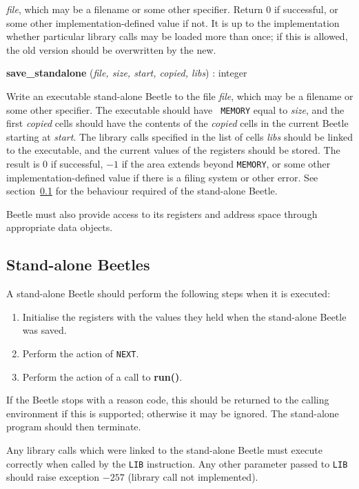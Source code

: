 \documentclass{article}
\newlength{\itemwidth}\itemwidth=\textwidth \advance\itemwidth by -0.1in
\newlength{\innerwidth}\innerwidth=\itemwidth \advance\innerwidth by -0.5in
\newcommand{\iface}[4]{\item[]\parbox{\itemwidth}{{\bf #1} ({\it #2}\/) :
#3\\[0.5ex]\hspace*{0.4in}\parbox{\innerwidth}{#4}}}
\begin{document}
\begin{description}
{    \textit{file}, which may be a filename or some other specifier. Return 0 if
    successful, or some other implementation-defined value if not. It is up
    to the implementation whether particular library calls may be loaded
    more than once; if this is allowed, the old version should be
    overwritten by the new.}
\iface{save\_standalone}{file, size, start, copied, libs}{integer}{Write an
    executable stand-alone Beetle to the file \textit{file}, which may be a
    filename or some other specifier. The executable should have {\tt
    MEMORY} equal to \textit{size}, and the first \textit{copied} cells should
    have the contents of the \textit{copied} cells in the current Beetle
    starting at \textit{start}. The library calls specified in the list of
    cells \textit{libs} should be linked to the executable, and the current
    values of the registers should be stored. The result is 0 if successful,
    $-1$ if the area extends beyond {\tt MEMORY}, or some other
    implementation-defined value if there is a filing system or other error. See
    section~\ref{standalone} for the behaviour required of the stand-alone
    Beetle.}
\end{description}

Beetle must also provide access to its registers and address space through
appropriate data objects.


\subsection{Stand-alone Beetles}
\label{standalone}

A stand-alone Beetle should perform the following steps when it is executed:

\begin{enumerate}
\item Initialise the registers with the values they held when the
    stand-alone Beetle was saved.
\item Perform the action of {\tt NEXT}.
\item Perform the action of a call to {\bf run()}.
\end{enumerate}

If the Beetle stops with a reason code, this should be returned to the calling
environment if this is supported; otherwise it may be ignored. The stand-alone
program should then terminate.

Any library calls which were linked to the stand-alone Beetle must execute
correctly when called by the {\tt LIB} instruction. Any other parameter passed
to {\tt LIB} should raise exception $-257$ (library call not implemented).
\end{document}
